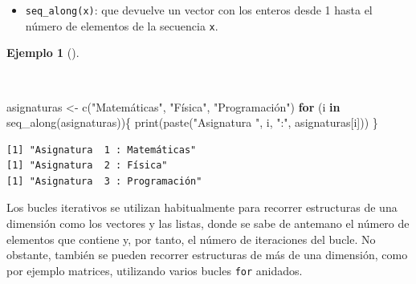 \documentclass[
  a4paper,
]{scrreport}
\newenvironment{Shaded}{\begin{snugshade}}{\end{snugshade}}
\newcommand{\ControlFlowTok}[1]{\textcolor[rgb]{0.00,0.23,0.31}{\textbf{#1}}}
\newcommand{\FunctionTok}[1]{\textcolor[rgb]{0.28,0.35,0.67}{#1}}
\newcommand{\NormalTok}[1]{\textcolor[rgb]{0.00,0.23,0.31}{#1}}
\newcommand{\OtherTok}[1]{\textcolor[rgb]{0.00,0.23,0.31}{#1}}
\newcommand{\StringTok}[1]{\textcolor[rgb]{0.13,0.47,0.30}{#1}}
\providecommand{\tightlist}{%
  \setlength{\itemsep}{0pt}\setlength{\parskip}{0pt}}\usepackage{longtable,booktabs,array}
\theoremstyle{definition}
\theoremstyle{definition}
\newtheorem{example}{Ejemplo}[chapter]
\theoremstyle{remark}
\begin{document}
\begin{itemize}
\tightlist
\item
  \texttt{seq\_along(x)}: que devuelve un vector con los enteros desde 1
  hasta el número de elementos de la secuencia \texttt{x}.
\end{itemize}

\begin{example}[]\protect\hypertarget{exm-bucle-iterativo-posicion}{}\label{exm-bucle-iterativo-posicion}

~

\begin{Shaded}
\begin{Highlighting}[]
\NormalTok{asignaturas }\OtherTok{\textless{}{-}} \FunctionTok{c}\NormalTok{(}\StringTok{"Matemáticas"}\NormalTok{, }\StringTok{"Física"}\NormalTok{, }\StringTok{"Programación"}\NormalTok{)}
\ControlFlowTok{for}\NormalTok{ (i }\ControlFlowTok{in} \FunctionTok{seq\_along}\NormalTok{(asignaturas))\{}
  \FunctionTok{print}\NormalTok{(}\FunctionTok{paste}\NormalTok{(}\StringTok{"Asignatura "}\NormalTok{, i, }\StringTok{":"}\NormalTok{, asignaturas[i]))}
\NormalTok{\}}
\end{Highlighting}
\end{Shaded}

\begin{verbatim}
[1] "Asignatura  1 : Matemáticas"
[1] "Asignatura  2 : Física"
[1] "Asignatura  3 : Programación"
\end{verbatim}

\end{example}

Los bucles iterativos se utilizan habitualmente para recorrer
estructuras de una dimensión como los vectores y las listas, donde se
sabe de antemano el número de elementos que contiene y, por tanto, el
número de iteraciones del bucle. No obstante, también se pueden recorrer
estructuras de más de una dimensión, como por ejemplo matrices,
utilizando varios bucles \texttt{for} anidados.
\end{document}
